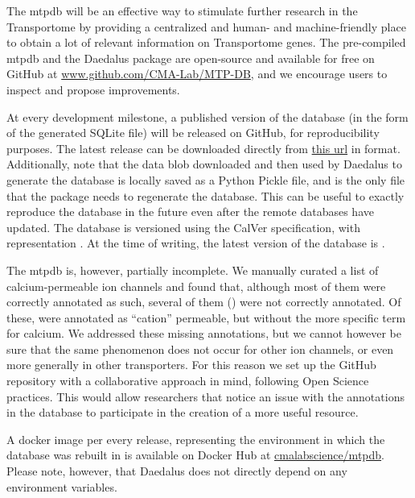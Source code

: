 The \gls{mtpdb} will be an effective way to stimulate further research in the Transportome by providing a centralized and human- and machine-friendly place to obtain a lot of relevant information on Transportome genes.
The pre-compiled \gls{mtpdb} and the Daedalus package are open-source and available for free on GitHub at \href{https://github.com/CMA-Lab/MTP-DB/}{www.github.com/CMA-Lab/MTP-DB}, and we encourage users to inspect and propose improvements.

At every development milestone, a published version of the database (in the form of the generated SQLite file) will be released on GitHub, for reproducibility purposes.
The latest release can be downloaded directly from \href{https://github.com/CMA-Lab/MTP-DB/releases/latest/download/MTPDB.sqlite.gz}{this url} in  format.
Additionally, note that the data blob downloaded and then used by Daedalus to generate the database is locally saved as a Python Pickle file, and is the only file that the package needs to regenerate the database.
This can be useful to exactly reproduce the database in the future even after the remote databases have updated.
The database is versioned using the CalVer specification, with representation .
At the time of writing, the latest version of the database is .

The \gls{mtpdb} is, however, partially incomplete.
We manually curated a list of  calcium-permeable ion channels and found that, although most of them were correctly annotated as such, several of them () were not correctly annotated.
Of these,  were annotated as ``cation'' permeable, but without the more specific term for calcium.
We addressed these missing annotations, but we cannot however be sure that the same phenomenon does not occur for other ion channels, or even more generally  in other transporters.
For this reason we set up the GitHub repository with a collaborative approach
in mind, following Open Science practices.
This would allow researchers that notice an issue with the annotations in the database to participate in the creation of a more useful resource.

A docker image per every release, representing the environment in which the database was rebuilt in is available on Docker Hub at \href{https://hub.docker.com/r/cmalabscience/mtpdb}{cmalabscience/mtpdb}.
Please note, however, that Daedalus does not directly depend on any environment variables.

